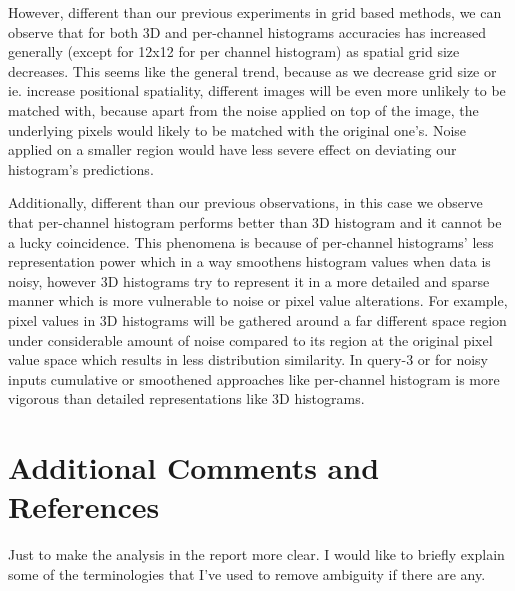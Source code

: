 \documentclass[12pt]{article}
\begin{document}
However, different than our previous experiments in grid based methods,
we can observe that for both 3D and per-channel histograms accuracies has increased 
generally (except for 12x12 for per channel histogram) as spatial grid size decreases. 
This seems like the general trend, because as we decrease grid size or ie. increase positional spatiality,
different images will be even more unlikely to be matched with, because apart from the noise applied on top
of the image, the underlying pixels would likely to be matched with the original one's.
Noise applied on a smaller region would have less severe effect on deviating our histogram's predictions.

Additionally, different than our previous observations, in this case we observe that 
per-channel histogram performs better than 3D histogram and it cannot be a lucky coincidence.
This phenomena is because of per-channel histograms' less representation power
which in a way smoothens histogram values when data is noisy, however 3D histograms try to represent
it in a more detailed and sparse manner which is more vulnerable to noise or pixel value alterations.
For example, pixel values in 3D histograms will be gathered around a far different space region 
under considerable amount of noise compared to its region at the original pixel value space which results in less distribution similarity. 
In query-3 or for noisy inputs cumulative or smoothened approaches like per-channel histogram is more vigorous than detailed representations like 3D histograms.



\section{Additional Comments and References}

Just to make the analysis in the report more clear. I would like to briefly explain some of the terminologies 
that I've used to remove ambiguity if there are any.
\end{document}
